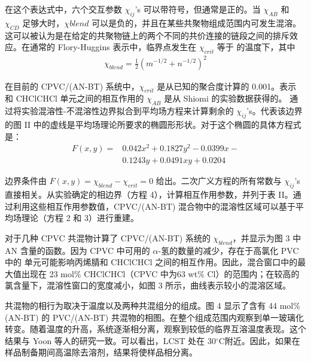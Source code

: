 \documentclass[a4paper,transmag,12pt]{IEEEtran}    %
\newcommand{\cdegree}{$^{\circ}$C}  %
\begin{document}
在这个表达式中，六个交互参数 $\chi_{ij}$'s 可以带符号，但通常是正的。当 $\chi_{AB}$ 和 $\chi_{CD}$ 足够大时，$\chi{blend}$ 可以是负的，并且在某些共聚物组成范围内可发生混溶。这可以被认为是在给定的共聚物链上的两个不同的共价连接的链段之间的排斥效应。在通常的 Flory-Huggins 表示中，临界点发生在 $\chi_{crit}$ 等于  的温度下，其中
\begin{equation}
    \begin{aligned}
        \chi_{blend} = \frac{1}{2}(m^{-1/2}+n^{-1/2})^2
    \end{aligned}
\end{equation}

在目前的 CPVC/(AN-BT) 系统中，$\chi_{crit}$ 是从已知的聚合度计算的 0.001。表示  和 CHClCHCl 单元之间的相互作用的 $\chi_{AB}$ 是从 Shiomi 的实验数据获得的。 通过将实验混溶性-不混溶性边界拟合到平均场方程来计算剩余的 $\chi_{ij}$'s。代表该边界的图 II 中的虚线是平均场理论所要求的椭圆形形状。对于这个椭圆的具体方程式是：
\begin{equation}
    \begin{aligned}
        F(x, y) = &0.042x^2 + 0.1827y^2 - 0.0399x - \\
                  &0.1243y + 0.0491xy + 0.0204
    \end{aligned}
\end{equation}

边界条件由 $F(x, y) = \chi_{blend} - \chi_{crit} = 0$ 给出。二次广义方程的所有常数与 $\chi_{ij}$'s 直接相关。从实验确定的相边界（方程 4），计算相互作用参数，并列于表 II。通过利用这些相互作用参数值，CPVC/(AN-BT) 混合物中的混溶性区域可以基于平均场理论（方程 2 和 3）进行重建。\par{}
对于几种 CPVC 共混物计算了 CPVC/(AN-BT) 系统的 $\chi_{blend}$，并显示为图 3 中 AN 含量的函数。因为 CPVC 中可用的 $\alpha$-氢的数量的减少，存在于高氯化 PVC 中的  单元可能影响丙烯腈和 CHClCHCl 之间的相互作用。因此，混合窗口中的最大值出现在 23 mol\% CHClCHCl（CPVC 中为63 wt\% Cl）的范围内；在较高的氯含量下，混溶性窗口的宽度减小，如图 3 所示，曲线表示较小的混溶区域。\par{}
共混物的相行为取决于温度以及两种共混组分的组成。图 4 显示了含有 44 mol\% (AN-BT) 的 PVC/(AN-BT) 共混物的相图。在整个组成范围内观察到单一玻璃化转变。随着温度的升高，系统逐渐相分离，观察到较低的临界互溶温度表现。这个结果与 Yoon 等人的研究一致。可以看出，LCST 处在 30\cdegree 附近。因此，如果在样品制备期间高温除去溶剂，结果将使样品相分离。\par{}
\end{document}
